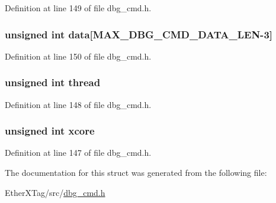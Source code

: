 Definition at line 149 of file dbg\-\_\-cmd.\-h.

\hypertarget{structdbg__cmd__type__step_a728dc245dc576de10147524d6a701ef3}{
\subsubsection[{data}]{\setlength{\rightskip}{0pt plus 5cm}unsigned int data\mbox{[}{\bf M\-A\-X\-\_\-\-D\-B\-G\-\_\-\-C\-M\-D\-\_\-\-D\-A\-T\-A\-\_\-\-L\-E\-N}-\/3\mbox{]}}}\label{structdbg__cmd__type__step_a728dc245dc576de10147524d6a701ef3}


Definition at line 150 of file dbg\-\_\-cmd.\-h.

\hypertarget{structdbg__cmd__type__step_a13f572e7828e1694c6f9c9c78bf7d8f5}{
\subsubsection[{thread}]{\setlength{\rightskip}{0pt plus 5cm}unsigned int thread}}\label{structdbg__cmd__type__step_a13f572e7828e1694c6f9c9c78bf7d8f5}


Definition at line 148 of file dbg\-\_\-cmd.\-h.

\hypertarget{structdbg__cmd__type__step_a78357326dd562d441c3c73f5676ac638}{
\subsubsection[{xcore}]{\setlength{\rightskip}{0pt plus 5cm}unsigned int xcore}}\label{structdbg__cmd__type__step_a78357326dd562d441c3c73f5676ac638}


Definition at line 147 of file dbg\-\_\-cmd.\-h.



The documentation for this struct was generated from the following file\-:\begin{DoxyCompactItemize}
\item 
Ether\-X\-Tag/src/\hyperlink{dbg__cmd_8h}{dbg\-\_\-cmd.\-h}\end{DoxyCompactItemize}
